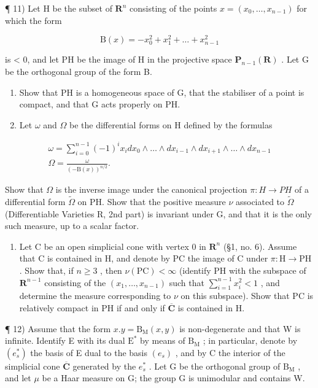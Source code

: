 ¶ 11) Let H be the subset of \(\mathbf{R}^n\) consisting of the points \(x = (x_0, \ldots, x_{n-1})\) for which the form

\[
\mathrm{B} (x) = - x _ {0} ^ {2} + x _ {1} ^ {2} + \dots + x _ {n - 1} ^ {2}
\]

is \textless{} 0, and let PH be the image of H in the projective space \(\mathbf{P}_{n-1}(\mathbf{R})\) . Let G be the orthogonal group of the form B.

\begin{enumerate}
\def\labelenumi{\alph{enumi})}
\item
  Show that PH is a homogeneous space of G, that the stabiliser of a point is compact, and that G acts properly on PH.
\item
  Let \(\omega\) and \(\Omega\) be the differential forms on H defined by the formulas
\end{enumerate}

\[
\begin{array}{c} \omega = \sum_ {i = 0} ^ {n - 1} (- 1) ^ {i} x _ {i} d x _ {0} \wedge \dots \wedge d x _ {i - 1} \wedge d x _ {i + 1} \wedge \dots \wedge d x _ {n - 1} \\ \Omega = \frac {\omega}{(- \mathrm{B} (x)) ^ {n / 2}}. \end{array}
\]

Show that \(\Omega\) is the inverse image under the canonical projection \(\pi:H\to PH\) of a differential form \(\tilde{\Omega}\) on PH. Show that the positive measure \(\nu\) associated to \(\tilde{\Omega}\) (Differentiable Varieties R, 2nd part) is invariant under G, and that it is the only such measure, up to a scalar factor.

\begin{enumerate}
\def\labelenumi{\alph{enumi})}
\setcounter{enumi}{2}
\tightlist
\item
  Let C be an open simplicial cone with vertex 0 in \(\mathbf{R}^n\) (§1, no. 6). Assume that C is contained in H, and denote by PC the image of C under \(\pi: \mathrm{H} \to \mathrm{PH}\) . Show that, if \(n \geqslant 3\) , then \(\nu(\mathrm{PC}) < \infty\) (identify PH with the subspace of \(\mathbf{R}^{n-1}\) consisting of the \((x_1, \ldots, x_{n-1})\) such that \(\sum_{i=1}^{n-1} x_i^2 < 1\) , and determine the measure corresponding to \(\nu\) on this subspace). Show that PC is relatively compact in PH if and only if \(\overline{\mathbf{C}}\) is contained in H.
\end{enumerate}

¶ 12) Assume that the form \(x.y = \mathrm{B}_{\mathrm{M}}(x,y)\) is non-degenerate and that W is infinite. Identify E with its dual \(\mathrm{E}^*\) by means of \(\mathrm{B}_{\mathrm{M}}\) ; in particular, denote by \((e_s^*)\) the basis of E dual to the basis \((e_s)\) , and by C the interior of the simplicial cone \(\overline{\mathbf{C}}\) generated by the \(e_s^*\) . Let G be the orthogonal group of \(\mathrm{B}_{\mathrm{M}}\) , and let \(\mu\) be a Haar measure on G; the group G is unimodular and contains W.

